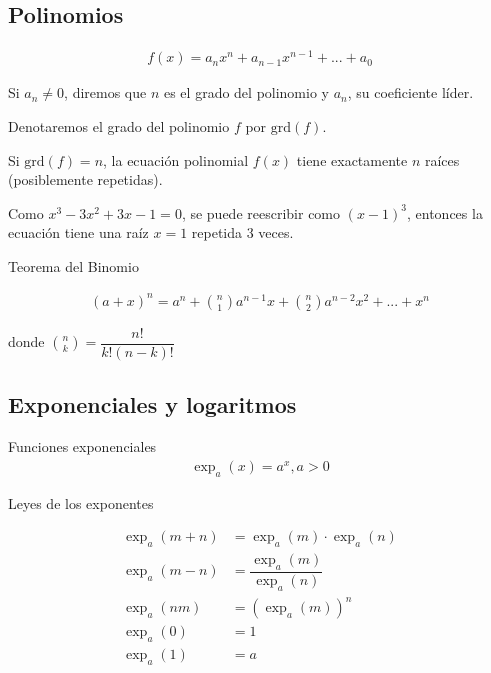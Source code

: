 \subsection{Polinomios}
 
     \begin{align}
   f(x) = a_{n}x^{n}+a_{n-1}x^{n-1}+...+a_{0}
   \end{align}
    
   Si $a_{n}\neq 0$, diremos que $n$ es el grado del polinomio y $a_{n}$, su coeficiente líder. 
   
   
   Denotaremos el grado del polinomio $f$ por $\mathrm{grd}(f)$.

{}
Si $\mathrm{grd}(f)=n$, la ecuación polinomial $f(x)$ tiene exactamente $n$ raíces (posiblemente repetidas).


\begin{problema}
 Como $x^{3}-3x^{2}+3x-1=0$, se puede reescribir como $(x-1)^{3}$,  entonces la ecuación tiene una raíz $x=1$ repetida 3 veces. 
\end{problema}


{Teorema del Binomio}
  
     \begin{align}
   \left( a+x \right)^{n} = 
   a^{n}+\binom{n}{1}a^{n-1}x+\binom{n}{2}a^{n-2}x^{2}+...+x^{n}
   \end{align}

donde $\binom{n}{k}=\dfrac{n!}{k!\left( n-k \right)!}$

\subsection{Exponenciales y logaritmos}
{Funciones exponenciales}
     \begin{align}
   \exp_{a}(x) = a^{x}, a> 0
   \end{align}
   

{Leyes de los exponentes}

        \begin{align}
    \exp_a(m+n) &= 
     \exp_{a}(m)\cdot \exp_{a}(n) \\
     \exp_a(m-n) &=    
     \dfrac{\exp_a(m)}{\exp_a(n)}     \\
     \exp_a(nm) &=      
     \left( \exp_a(m)\right)^{n}  \\       
     \exp_a(0) &=  1 \\     
     \exp_a(1) &=  a     
     \end{align}

